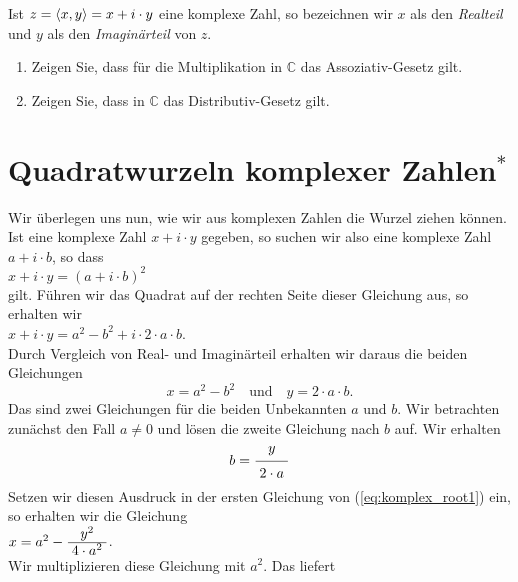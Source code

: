 \remark
Ist $z = \pair(x,y) = x + i \cdot y$ eine komplexe Zahl, so bezeichnen wir $x$ als den \emph{\color{blue}Realteil}
und $y$ als den \emph{\color{blue}Imagin\"{a}rteil} von $z$.

\exerciseStar
\renewcommand{\labelenumi}{(\alph{enumi})}
\begin{enumerate}
\item Zeigen Sie, dass f\"{u}r die Multiplikation in $\mathbb{C}$ das Assoziativ-Gesetz gilt.
\item Zeigen Sie, dass in $\mathbb{C}$ das Distributiv-Gesetz gilt. \exend
\end{enumerate}
\renewcommand{\labelenumi}{\arabic{enumi}.}


\section{Quadratwurzeln komplexer Zahlen$^*$}
Wir \"{u}berlegen uns nun, wie wir aus komplexen Zahlen die Wurzel ziehen k\"{o}nnen.  Ist eine komplexe Zahl
$x + i \cdot y$ gegeben, so suchen wir also eine komplexe Zahl $a + i \cdot b$, so dass
\\[0.2cm]
\hspace*{1.3cm}
$x + i \cdot y = (a + i \cdot b)^2$
\\[0.2cm]
gilt.  F\"{u}hren wir das Quadrat auf der rechten Seite dieser Gleichung aus, so erhalten wir
\\[0.2cm]
\hspace*{1.3cm}
$x + i \cdot y = a^2 - b^2 + i \cdot 2 \cdot a \cdot b$.
\\[0.2cm]
Durch Vergleich von Real- und Imagin\"{a}rteil erhalten wir daraus die beiden Gleichungen
\begin{equation}
  \label{eq:komplex_root1}
  x = a^2 - b^2 \quad \mbox{und} \quad y = 2 \cdot a \cdot b.
\end{equation}
Das sind zwei Gleichungen f\"ur die beiden Unbekannten $a$ und $b$.
Wir betrachten zun\"{a}chst den Fall $a \not= 0$ und
l\"{o}sen die zweite Gleichung nach $b$ auf.  Wir erhalten
\begin{equation}
  \label{eq:komplex_root2}
  b = \bruch{y}{2 \cdot a}  
\end{equation}
Setzen wir diesen Ausdruck in der ersten Gleichung von (\ref{eq:komplex_root1}) ein, so erhalten wir die
Gleichung 
\\[0.2cm]
\hspace*{1.3cm}
$x = a^2 - \bruch{y^2}{4 \cdot a^2}$.
\\[0.2cm]
Wir multiplizieren diese Gleichung mit $a^2$. Das liefert 
